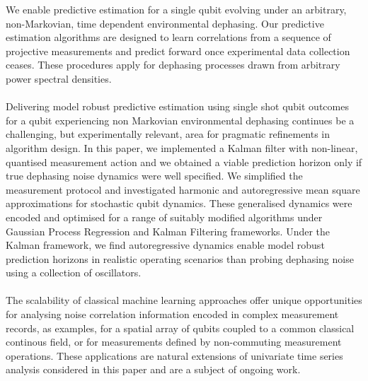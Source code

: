 We enable predictive estimation for a single qubit evolving under an arbitrary, non-Markovian, time dependent environmental dephasing. Our predictive estimation algorithms are designed to learn correlations from a sequence of projective measurements and predict forward once experimental data collection ceases. These procedures apply for dephasing processes drawn from arbitrary power spectral densities.
\\
\\
Delivering model robust predictive estimation using single shot qubit outcomes for a qubit experiencing non Markovian environmental dephasing continues be a challenging, but experimentally relevant, area for pragmatic refinements in algorithm design. In this paper, we implemented a Kalman filter with non-linear, quantised measurement action and we obtained a viable prediction horizon only if true dephasing noise dynamics were well specified. We simplified the measurement protocol and investigated harmonic and autoregressive mean square approximations for stochastic qubit dynamics. These generalised dynamics were encoded and optimised for a range of suitably modified algorithms under Gaussian Process Regression and Kalman Filtering frameworks. Under the Kalman framework, we find autoregressive dynamics enable model robust prediction horizons in realistic operating scenarios than probing dephasing noise using a collection of oscillators. 
\\
\\
The scalability of classical machine learning approaches offer unique opportunities for analysing noise correlation information encoded in complex measurement records, as examples, for a spatial array of qubits coupled to a common classical continous field, or for measurements defined by non-commuting measurement operations. These applications are natural extensions of univariate time series analysis considered in this paper and are a subject of ongoing work.
